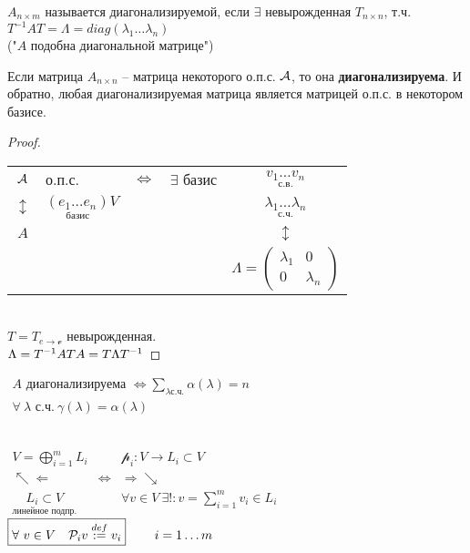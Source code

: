\documentclass[../main.tex]{subfiles}
\begin{document}
	\begin{defin}
		$A_{n\times m}$ называется диагонализируемой, если $\exists$ невырожденная $T_{n\times n}$, т.ч.\\ $T^{-1}AT = \Lambda = diag(\lambda_1\ldots\lambda_n)$\\
		("$A$ подобна диагональной матрице")
	\end{defin}
	\begin{corollary}
		Если матрица $A_{n\times n}$ -- матрица некоторого о.п.с. $\mathcal{A}$, то она \textbf{диагонализируема}. И обратно, любая диагонализируемая матрица является матрицей о.п.с. в некотором базисе.
	\end{corollary}
	\begin{proof}\ \\
		\begin{tabular}{clccc}
			$\mathcal{A}$ & о.п.с. & $\Leftrightarrow$ & $\exists$ базис & $\underset{\text{с.в.}}{v_1\ldots v_n}$\\
			$\updownarrow$ & $\underset{\text{базис}}{(e_1\ldots e_n)}V$ & & & $\underset{\text{с.ч.}}{\lambda_1\ldots \lambda_n}$\\
			$A$ & & & & $\updownarrow$\\
			& & & &$\Lambda = \begin{pmatrix}
			\lambda_1 & 0\\ 0 & \lambda_n
			\end{pmatrix}$
		\end{tabular}\\
		$T = T_{e\rightarrow \mathscr{v}}$ невырожденная.\\
		$\Lambda = T^{-1} A T\\
		A = T \Lambda T^{-1}$
	\end{proof}
	$\boxed{
		\begin{array}{r}
		A \text{ диагонализируема }\Leftrightarrow \sum\limits_{\lambda\text{с.ч.}}\alpha(\lambda) = n\\
		\forall \ \lambda \text{ с.ч.} \ \gamma(\lambda) = \alpha (\lambda)
		\end{array}
	}$
	\begin{defin}\ \\
		$\begin{array}{ccc}
		V = \bigoplus\limits_{i=1}^m L_i & & \mathscr{p}_i : V\rightarrow L_i \subset V\\
		\nwarrow\Leftarrow & \Leftrightarrow & \Rightarrow\searrow\\
		\underset{\text{линейное подпр.}}{L_i \subset V} & & \forall v \in V \  \exists ! : v = \sum\limits_{i=1}^m v_i \in L_i
		\end{array}$\\
		$\boxed{\forall \ v\in V \ \ \ \mathcal{P}_i v \overset{def}{:=}v_i} \ \ \ \ \ \ \; i = 1\ldots m$
	\end{defin}
\end{document}

